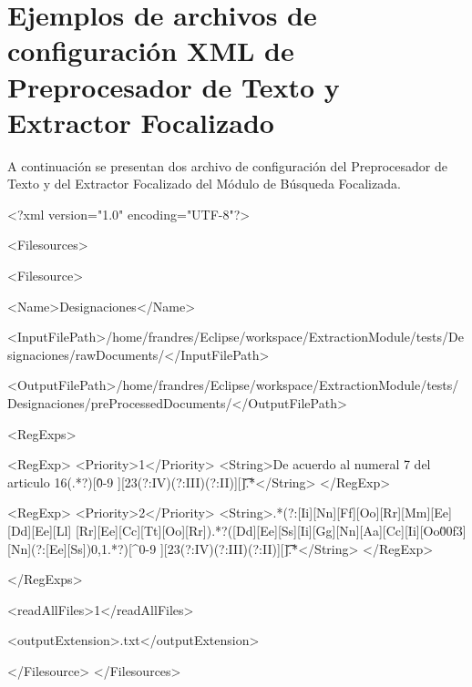\chapter{Ejemplos de archivos de configuración XML de Preprocesador de Texto y Extractor Focalizado}\label{chap:apendiceA}

A continuación se presentan dos archivo de configuración del Preprocesador de Texto y del Extractor Focalizado del Módulo de Búsqueda Focalizada. 

\begin{code}[includerangemarker=false,frame=single,label=xml:Preprocesador,caption=Archivo de configuración del Preprocesador de Texto con Dominio Designaciones,firstnumber=0, mathescape]
<?xml version="1.0" encoding="UTF-8"?>

<Filesources>

	<Filesource>
	
  		<Name>Designaciones</Name>
  		
        <InputFilePath>/home/frandres/Eclipse/workspace/ExtractionModule/tests/Designaciones/rawDocuments/</InputFilePath>
        
        <OutputFilePath>/home/frandres/Eclipse/workspace/ExtractionModule/tests/Designaciones/preProcessedDocuments/</OutputFilePath>
        
        <RegExps>
        
            <RegExp>
        		<Priority>1</Priority>
       		<String>De acuerdo al numeral 7 del articulo 16(.*?)[\^0-9 ][23(?:IV)(?:III)(?:II)][\.\t].*</String>
        	</RegExp>
        	
        	<RegExp>
        		<Priority>2</Priority>
        		<String>.*(?:[Ii][Nn][Ff][Oo][Rr][Mm][Ee] [Dd][Ee][Ll] [Rr][Ee][Cc][Tt][Oo][Rr]).*?([Dd][Ee][Ss][Ii][Gg][Nn][Aa][Cc][Ii][Oo\u00f3][Nn](?:[Ee][Ss]){0,1}.*?)[^0-9 ][23(?:IV)(?:III)(?:II)][\.\t].*</String>
        	</RegExp>     
        	   	
        </RegExps>
        
        <readAllFiles>1</readAllFiles>
        
        <outputExtension>.txt</outputExtension>   
        
	</Filesource>
</Filesources>  
\end{code}

